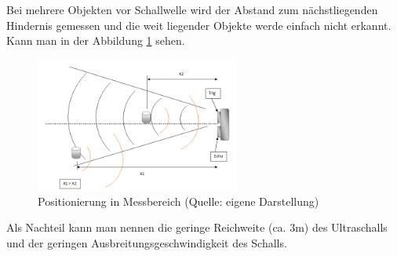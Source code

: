 Bei mehrere Objekten vor Schallwelle wird der Abstand zum nächstliegenden Hindernis gemessen und die weit liegender Objekte werde einfach nicht erkannt. Kann man in der Abbildung \ref{bild_3} sehen.


\begin{figure}[ht]  %
	\centering\includegraphics[width=0.6\textwidth]{images/Bild-3.png}
	\caption{Positionierung in Messbereich \newline (Quelle: eigene Darstellung)}
	\label{bild_3} %
\end{figure}

Als Nachteil kann man nennen die geringe Reichweite (ca. 3m) des Ultraschalls und  der geringen Ausbreitungsgeschwindigkeit des Schalls.

